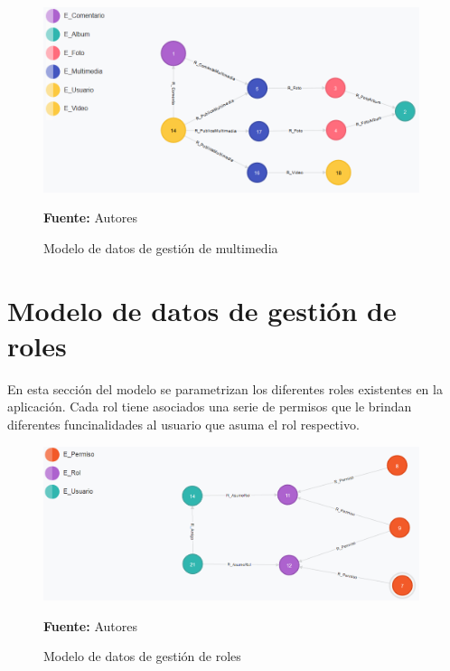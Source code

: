 \begin{figure}[!htb]
  \begin{center}
    \includegraphics[width=11cm]{./imagenes/Modelo_de_datos/Multimedia.png}
    \caption{Modelo de datos de gestión de multimedia}
    \label{fig:modelo_datos_gestion_multimedia}
    \textbf{Fuente:}  Autores
  \end{center}
\end{figure}

\section{Modelo de datos de gestión de roles}

En esta sección del modelo se parametrizan los diferentes roles existentes en la aplicación. Cada rol tiene asociados una serie de permisos que le brindan diferentes funcinalidades al usuario que asuma el rol respectivo.

\begin{figure}[!htb]
  \begin{center}
    \includegraphics[width=11cm]{./imagenes/Modelo_de_datos/Roles.png}
    \caption{Modelo de datos de gestión de roles}
    \label{fig:modelo_datos_gestion_roles}
    \textbf{Fuente:}  Autores
  \end{center}
\end{figure}
